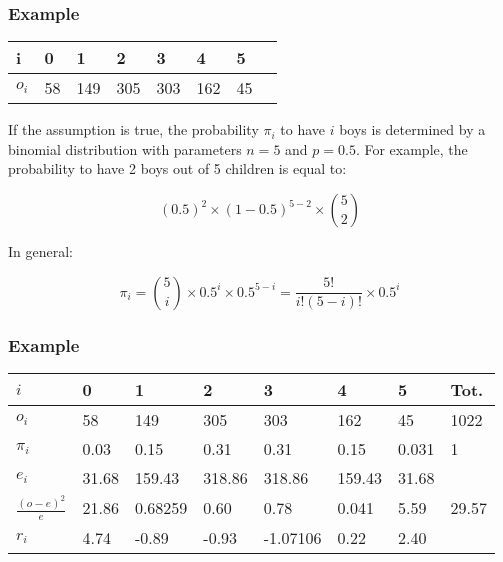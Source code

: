 \documentclass[aspectratio=169]{beamer}
\begin{document}
\begin{frame}
  \frametitle{Example}
  \begin{table}[h]
    \begin{tabular}{@{}llllllll@{}}
      \toprule
      i       & 0  & 1   & 2   & 3   & 4   & 5  &  \\ \midrule
      $o_{i}$ & 58 & 149 & 305 & 303 & 162 & 45 &  \\ \bottomrule
    \end{tabular}
  \end{table}
  \pause
  If the assumption is true, the probability $\pi_{i}$ to have $i$ boys is determined by a binomial distribution with parameters $n=5$ and $p=0.5$.
  For example, the probability to have 2 boys out of 5 children is equal to:
  
  \[ (0.5)^{2} \times (1-0.5)^{5-2} \times \binom{5}{2} \]
  
  In general:
  
  \[ \pi_{i} = \binom{5}{i}\times 0.5^{i} \times 0.5^{5-i} = \frac{5!}{i!(5-i)!}\times 0.5^{i} \]
\end{frame}

\begin{frame}
  \frametitle{Example}
  \begin{table}[h]
    \begin{tabular}{@{}llllllll@{}}
      \toprule
      $i$                   & 0     & 1       & 2      & 3        & 4      & 5     & Tot.  \\ \midrule
      $o_i$                 & 58    & 149     & 305    & 303      & 162    & 45    & 1022  \\
      $\pi_i$               & 0.03  & 0.15    & 0.31   & 0.31     & 0.15   & 0.031 & 1     \\
      $e_i$                 & 31.68 & 159.43  & 318.86 & 318.86   & 159.43 & 31.68 &       \\
      $\frac{(o-e)^{2}}{e}$ & 21.86 & 0.68259 & 0.60   & 0.78     & 0.041  & 5.59  & 29.57 \\
      $r_i$                 & 4.74  & -0.89   & -0.93  & -1.07106 & 0.22   & 2.40  &       \\ \bottomrule
    \end{tabular}
  \end{table}
\end{frame}
\end{document}
